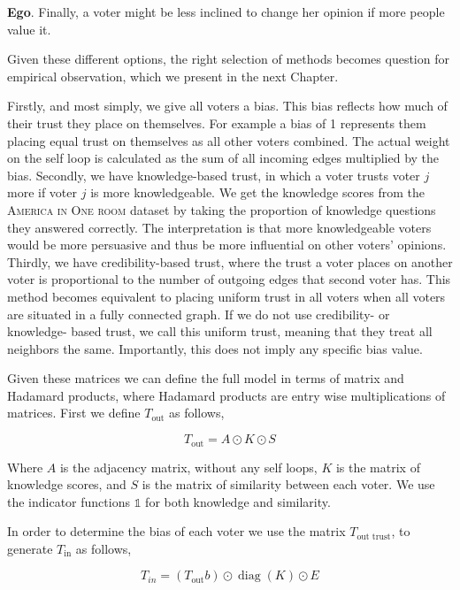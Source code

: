\textbf{Ego}. Finally, a voter might be less inclined to change her opinion if
more people value it.

Given these different options, the right selection of methods becomes question
for empirical observation, which we present in the next Chapter.

Firstly, and most simply, we give all voters a bias. This bias reflects how
much of their trust they place on themselves. For example a bias of 1
represents them placing equal trust on themselves as all other voters combined.
The actual weight on the self loop is calculated as the sum of all incoming
edges multiplied by the bias. Secondly, we have knowledge-based trust, in which
a voter trusts voter $j$ more if voter $j$ is more knowledgeable. We get the
knowledge scores from the \textsc{America in One room} dataset by taking the
proportion of knowledge questions they answered correctly. The interpretation
is that more knowledgeable voters would be more persuasive and thus be more
influential on other voters' opinions. Thirdly, we have credibility-based
trust, where the trust a voter places on another voter is proportional to the
number of outgoing edges that second voter has. This method becomes equivalent
to placing uniform trust in all voters when all voters are situated in a fully
connected graph. If we do not use credibility- or knowledge- based trust, we
call this uniform trust, meaning that they treat all neighbors the same.
Importantly, this does not imply any specific bias value.

Given these matrices we can define the full model in terms of matrix and
Hadamard products, where Hadamard products are entry wise multiplications of
matrices. First we define $T_{\text{out}}$ as follows,

\begin{equation}
	T_{\text{out}} = A \odot  K \odot S
	\label{eq:mat_out_trust}
\end{equation}

Where $A$ is the adjacency matrix, without any self loops, $K$ is the matrix of knowledge scores, and $S$ is the matrix of similarity between each voter. We use the indicator functions $\mathds{1}$ for both knowledge and similarity.

In order to determine the bias of each voter we use the matrix $T_{\text{out trust}}$, to generate $T_{\text{in}}$ as follows,

\begin{equation}
	T_{in} = (T_{\text{out}} b) \odot \operatorname{diag}(K) \odot E
	\label{eq:in_trust}
\end{equation}

